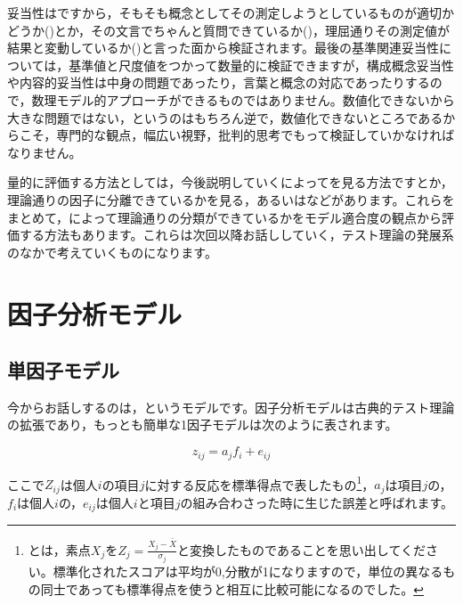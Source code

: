 \documentclass{ltjsbook}
\begin{document}
妥当性はですから，そもそも概念としてその測定しようとしているものが適切かどうか()とか，その文言でちゃんと質問できているか()，理屈通りその測定値が結果と変動しているか()と言った面から検証されます。最後の基準関連妥当性については，基準値と尺度値をつかって数量的に検証できますが，構成概念妥当性や内容的妥当性は中身の問題であったり，言葉と概念の対応であったりするので，数理モデル的アプローチができるものではありません。数値化できないから大きな問題ではない，というのはもちろん逆で，数値化できないところであるからこそ，専門的な観点，幅広い視野，批判的思考でもって検証していかなければなりません。

量的に評価する方法としては，今後説明していくによってを見る方法ですとか，理論通りの因子に分離できているかを見る，あるいはなどがあります。これらをまとめて，によって理論通りの分類ができているかをモデル適合度の観点から評価する方法もあります。これらは次回以降お話ししていく，テスト理論の発展系のなかで考えていくものになります。

\section{因子分析モデル}
\subsection{単因子モデル}
今からお話しするのは，というモデルです。因子分析モデルは古典的テスト理論の拡張であり，もっとも簡単な1因子モデルは次のように表されます。

\[ z_{ij} = a_j f_i + e_{ij} \]

ここで$Z_{ij}$は個人$i$の項目$j$に対する反応を標準得点で表したもの\footnote{とは，素点$X_j$を$Z_j = \frac{X_j - \bar{X}}{\sigma_j}$と変換したものであることを思い出してください。標準化されたスコアは平均が0,分散が1になりますので，単位の異なるもの同士であっても標準得点を使うと相互に比較可能になるのでした。}，$a_j$は項目$j$の，$f_i$は個人$i$の，$e_{ij}$は個人$i$と項目$j$の組み合わさった時に生じた誤差と呼ばれます。
\end{document}

